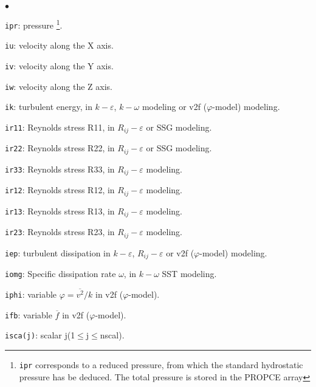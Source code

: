 {{{\begin{list}{$\bullet$}{}
\item \texttt{ipr}: pressure
\footnote{\texttt{ipr} corresponds to a
reduced pressure, from which the standard hydrostatic pressure has be
deduced. The total pressure is stored in the PROPCE array}.
\item \texttt{iu}: velocity along the X axis.
\item \texttt{iv}: velocity along the Y axis.
\item \texttt{iw}: velocity along the Z axis.
\item \texttt{ik}: turbulent energy, in $k-\varepsilon$,
$k-\omega$ modeling or v2f ($\varphi$-model) modeling.
\item \texttt{ir11}: Reynolds stress R11, in
      $R_{ij}-\varepsilon$ or SSG modeling.
\item \texttt{ir22}: Reynolds stress R22, in
      $R_{ij}-\varepsilon$ or SSG modeling.
\item \texttt{ir33}: Reynolds stress R33, in
      $R_{ij}-\varepsilon$ modeling.
\item \texttt{ir12}: Reynolds stress R12, in
      $R_{ij}-\varepsilon$ modeling.
\item \texttt{ir13}: Reynolds stress R13, in
      $R_{ij}-\varepsilon$ modeling.
\item \texttt{ir23}: Reynolds stress R23, in
      $R_{ij}-\varepsilon$ modeling.
\item \texttt{iep}: turbulent dissipation in $k-\varepsilon$,
$R_{ij}-\varepsilon$ or v2f ($\varphi$-model) modeling.
\item \texttt{iomg}: Specific dissipation rate $\omega$, in
$k-\omega$ SST modeling.
\item \texttt{iphi}: variable $\varphi=\overline{v^2}/k$ in v2f ($\varphi$-model).
\item \texttt{ifb}: variable $\overline{f}$ in v2f ($\varphi$-model).
\item \texttt{isca(j)}: scalar j(1$\leqslant$j$\leqslant$nscal).
\end{list}

\bigskip

}}}
